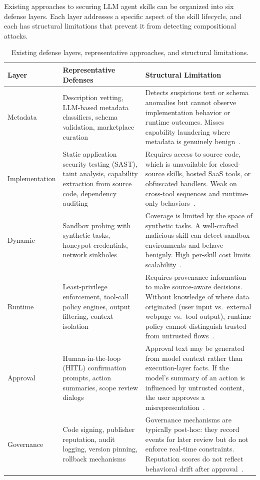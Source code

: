 Existing approaches to securing LLM agent skills can be organized into six defense layers. Each layer addresses a specific aspect of the skill lifecycle, and each has structural limitations that prevent it from detecting compositional attacks.

\begin{table}[ht]
\centering
\caption{Existing defense layers, representative approaches, and structural limitations.}
\label{tab:defense_layers}
\begin{tabular}{@{}p{2.2cm}p{4.5cm}p{7.5cm}@{}}
\toprule
\textbf{Layer} & \textbf{Representative Defenses} & \textbf{Structural Limitation} \\
\midrule
Metadata &
Description vetting, LLM-based metadata classifiers, schema validation, marketplace curation &
Detects suspicious text or schema anomalies but cannot observe implementation behavior or runtime outcomes. Misses capability laundering where metadata is genuinely benign~\cite{wang2026mcptox}. \\
\addlinespace
Implementation &
Static application security testing (SAST), taint analysis, capability extraction from source code, dependency auditing &
Requires access to source code, which is unavailable for closed-source skills, hosted SaaS tools, or obfuscated handlers. Weak on cross-tool sequences and runtime-only behaviors~\cite{li2026mcpitp}. \\
\addlinespace
Dynamic &
Sandbox probing with synthetic tasks, honeypot credentials, network sinkholes &
Coverage is limited by the space of synthetic tasks. A well-crafted malicious skill can detect sandbox environments and behave benignly. High per-skill cost limits scalability~\cite{sun2026vipermcp}. \\
\addlinespace
Runtime &
Least-privilege enforcement, tool-call policy engines, output filtering, context isolation &
Requires provenance information to make source-aware decisions. Without knowledge of where data originated (user input vs.\ external webpage vs.\ tool output), runtime policy cannot distinguish trusted from untrusted flows~\cite{hou2026mcpbiflow}. \\
\addlinespace
Approval &
Human-in-the-loop (HITL) confirmation prompts, action summaries, scope review dialogs &
Approval text may be generated from model context rather than execution-layer facts. If the model's summary of an action is influenced by untrusted content, the user approves a misrepresentation~\cite{zhou2026mcpshield}. \\
\addlinespace
Governance &
Code signing, publisher reputation, audit logging, version pinning, rollback mechanisms &
Governance mechanisms are typically post-hoc: they record events for later review but do not enforce real-time constraints. Reputation scores do not reflect behavioral drift after approval~\cite{owasp_mcp_tool_poisoning}. \\
\bottomrule
\end{tabular}
\end{table}

